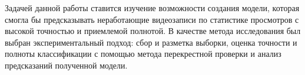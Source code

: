 Задачей данной работы ставится изучение возможности создания модели, которая смогла бы предсказывать неработающие видеозаписи по статистике просмотров с высокой точностью и приемлемой полнотой. В качестве метода исследования был выбран экспериментальный подход: сбор и разметка выборки, оценка точности и полноты классификации с помощью метода перекрестной проверки и анализ предсказаний полученной модели.